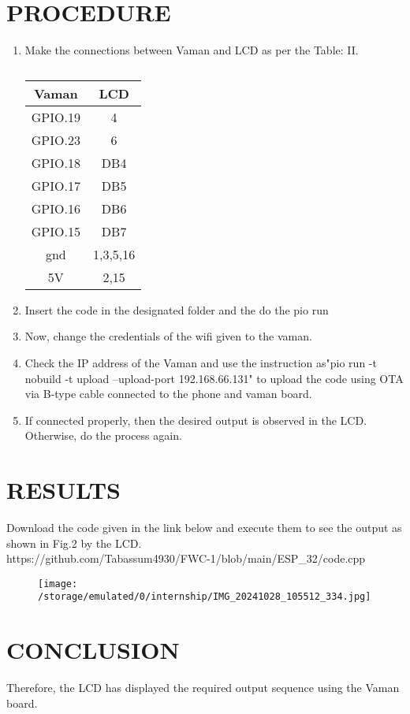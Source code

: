 \documentclass[conference]{IEEEtran}
\begin{document}
\section{PROCEDURE}
 \begin {enumerate}
 \item
 Make the connections between Vaman and LCD as per the Table: II.
 \begin{table}[htbp]                                       
\centering                                                          
\begin{tabular}{| c | c |} \hline                                
	\textbf{Vaman} & \textbf{LCD}  \\\hline 
GPIO.19 & 4  \\ \hline        
GPIO.23 &  6 \\ \hline        
GPIO.18 & DB4 \\ \hline                                           
GPIO.17  & DB5 \\ \hline 
GPIO.16 & DB6 \\ \hline
GPIO.15 & DB7 \\ \hline
gnd  & 1,3,5,16 \\ \hline                                    
5V & 2,15 \\ \hline               
\end{tabular}                     
\vspace{0.1cm}                    
\caption{\label{tab:widgets}}     
\end{table}
\item Insert the code in the designated folder and the do the pio run
\item Now, change the credentials of the wifi given to the vaman.
\item Check the IP address of the Vaman and use the instruction as"pio run -t nobuild -t upload --upload-port 192.168.66.131" to upload the code using OTA via B-type cable connected to the phone and vaman board.
\item If connected properly, then the desired output is observed in the LCD. Otherwise, do the process again.
	\end {enumerate}
\section{RESULTS}
Download the code given in the link below and execute them to see the output as shown in Fig.2 by the LCD. 
\\ https://github.com/Tabassum4930/FWC-1/blob/main/ESP\_32/code.cpp
\begin{figure}[h] 
	\centering 
	\texttt{[image: /storage/emulated/0/internship/IMG\_20241028\_105512\_334.jpg]}
	\caption{\label{fig:Gates}}    
\end{figure}
\section{CONCLUSION}
Therefore, the LCD has displayed the required output sequence using the Vaman board.
\end{document}

